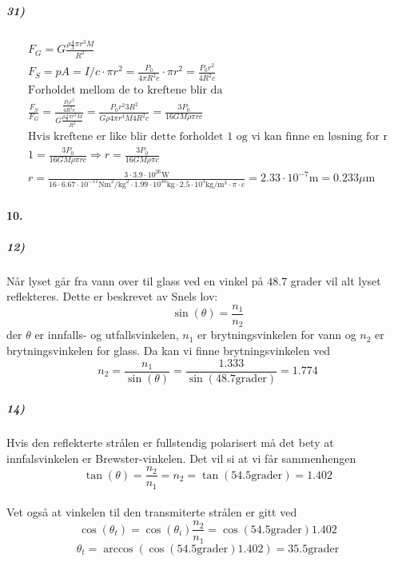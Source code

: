 \documentclass[11pt, A4paper,norsk]{article}
\begin{document}
			\subparagraph{31)}
				\begin{gather*}
F_G = G \frac{\rho \frac{4}{3} \pi r^3 M}{R^2} \\
F_S = p A = I / c \cdot \pi r^2 = \frac{P_0}{4 \pi R^2 c} \cdot \pi r^2 = \frac{P_0 r^2}{4 R^2 c} \\
\text{Forholdet mellom de to kreftene blir da} \\
\frac{F_S}{F_G} = \frac{\frac{P_0 r^2}{4 R^2 c}}{G \frac{\rho \frac{4}{3} \pi r^3 M}{R^2}} = \frac{P_0 r^2 3 R^2}{G \rho 4 \pi r^3 M 4 R^2 c} = \frac{3 P_0}{16 G M \rho \pi r c} \\
\text{Hvis kreftene er like blir dette forholdet $1$ og vi kan finne en løsning for r} \\
1 = \frac{3 P_0}{16 G M \rho \pi r c} \Rightarrow r = \frac{3 P_0}{16 G M \rho \pi c} \\
r = \frac{3 \cdot 3.9 \cdot 10^{26} \text{W}}{16 \cdot 6.67 \cdot 10^{-11} \text{Nm}^2/\text{kg}^2 \cdot 1.99 \cdot 10^{30} \text{kg} \cdot 2.5 \cdot 10^{3} \text{kg}/\text{m}^3 \cdot \pi \cdot c} = 2.33 \cdot 10^{-7} \text{m} = 0.233 \mu\text{m}
				\end{gather*}









		\paragraph{10.}
			\subparagraph{12)}
				\begin{flushleft}
Når lyset går fra vann over til glass ved en vinkel på $48.7$ grader vil alt lyset reflekteres. Dette er beskrevet av Snels lov:
$$\sin(\theta) = \frac{n_1}{n_2}$$
der $\theta$ er innfalls- og utfallsvinkelen, $n_1$ er brytningsvinkelen for vann og $n_2$ er brytningsvinkelen for glass. Da kan vi finne brytningsvinkelen ved
$$n_2 = \frac{n_1}{\sin(\theta)} = \frac{1.333}{\sin(48.7 \text{grader})} = 1.774$$
				\end{flushleft}










			\subparagraph{14)}
				\begin{flushleft}
Hvis den reflekterte strålen er fullstendig polarisert må det bety at innfalsvinkelen er Brewster-vinkelen. Det vil si at vi får sammenhengen
$$\tan(\theta) = \frac{n_2}{n_1} = n_2 = \tan(54.5 \text{grader}) = 1.402$$ \\
Vet også at vinkelen til den transmiterte strålen er gitt ved
$$\cos(\theta_t) = \cos(\theta_i) \frac{n_2}{n_1} = \cos(54.5 \text{grader}) 1.402$$
$$\theta_t = \arccos(\cos(54.5 \text{grader}) 1.402) = 35.5 \text{grader}$$
				\end{flushleft}
\end{document}

